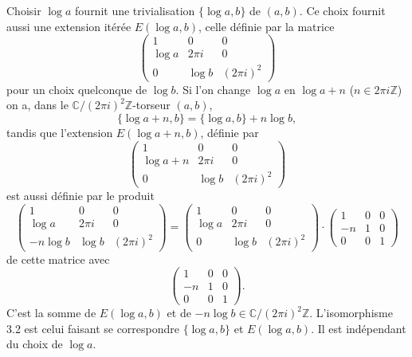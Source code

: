 \documentclass[12pt,a4paper]{article}
\theoremstyle{plain}
\theoremstyle{definition}
\theoremstyle{remark}
\newcommand{\Z}{\mathbb{Z}}
\newcommand{\C}{\mathbb{C}}
\begin{document}
Choisir $\log a$ fournit une trivialisation $\{\log a, b\}$ de $(a,b)$. Ce choix fournit aussi
une extension itérée $E(\log a, b)$, celle définie par la matrice
\[
\begin{pmatrix}
1 & 0 & 0 \\
\log a & 2\pi i & 0 \\
0 & \log b & (2\pi i)^2
\end{pmatrix}
\]
pour un choix quelconque de $\log b$. Si l'on change $\log a$ en $\log a + n$ ($n \in 2\pi i\Z$) on a,
dans le $\C/(2\pi i)^2\Z$-torseur $(a,b)$,
\[
\{\log a + n, b\} = \{\log a, b\} + n \log b,
\]
tandis que l'extension $E(\log a + n, b)$, définie par
\[
\begin{pmatrix}
1 & 0 & 0 \\
\log a + n & 2\pi i & 0 \\
0 & \log b & (2\pi i)^2
\end{pmatrix}
\]
est aussi définie par le produit
\[
\begin{pmatrix}
1 & 0 & 0 \\
\log a & 2\pi i & 0 \\
-n \log b & \log b & (2\pi i)^2
\end{pmatrix}
=
\begin{pmatrix}
1 & 0 & 0 \\
\log a & 2\pi i & 0 \\
0 & \log b & (2\pi i)^2
\end{pmatrix}
\cdot
\begin{pmatrix}
1 & 0 & 0 \\
-n & 1 & 0 \\
0 & 0 & 1
\end{pmatrix}
\]
de cette matrice avec
\[
\begin{pmatrix}
1 & 0 & 0 \\
-n & 1 & 0 \\
0 & 0 & 1
\end{pmatrix}.
\]
C'est la somme de $E(\log a, b)$ et de $-n \log b \in \C/(2\pi i)^2\Z$. L'isomorphisme 3.2 est
celui faisant se correspondre $\{\log a, b\}$ et $E(\log a, b)$. Il est indépendant du choix de
$\log a$.

\subsection{}
\end{document}
